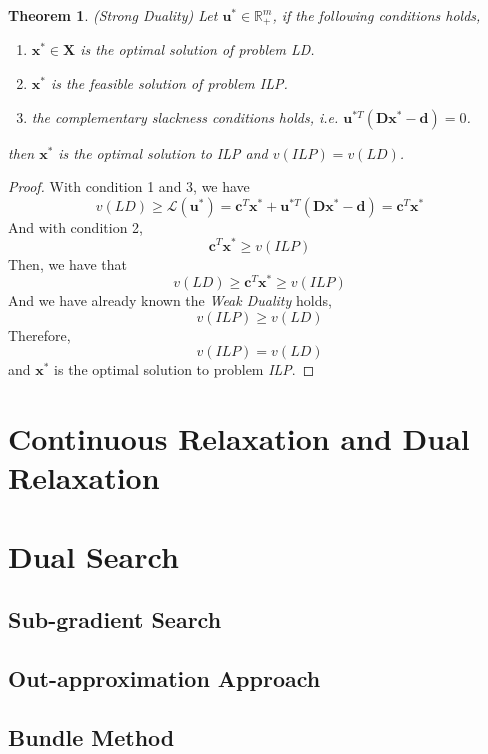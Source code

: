 \documentclass{article}
\newtheorem{thm}{Theorem}
\begin{document}
\begin{thm}
	(Strong Duality) Let $\bm{u}^* \in \mathbb{R}_+^m$, if the following conditions holds,
	\begin{enumerate}
		\item $\bm{x}^* \in \bm{X}$ is the optimal solution of problem \textit{LD}.
		\item $\bm{x}^*$ is the feasible solution of problem \textit{ILP}.
		\item the complementary slackness conditions holds, i.e. $\bm{u}^{*T}(\bm{D}\bm{x}^* - \bm{d}) = 0$.
	\end{enumerate} 
	then $\bm{x}^*$ is the optimal solution to \textit{ILP} and $v(ILP) = v(LD)$.
\end{thm}

\begin{proof}
	With condition 1 and 3, we have 
	\begin{equation}
		v(LD) \geq \mathcal{L}(\bm{u}^*) = \bm{c}^T\bm{x}^* + \bm{u}^{*T}(\bm{D}\bm{x}^*-\bm{d}) = \bm{c}^T\bm{x}^*
	\end{equation}
	And with condition 2, 
	\begin{equation}
		\bm{c}^T\bm{x}^* \geq v(ILP)
	\end{equation}
	Then, we have that
	\begin{equation}
		v(LD) \geq \bm{c}^T\bm{x}^* \geq v(ILP)
	\end{equation}
	And we have already known the \textit{Weak Duality} holds,
	\begin{equation}
		v(ILP) \geq v(LD)
	\end{equation}
	Therefore,
	\begin{equation}
		v(ILP) = v(LD)
	\end{equation}
	and $\bm{x}^*$ is the optimal solution to problem \textit{ILP}.
\end{proof}


\section{Continuous Relaxation and Dual Relaxation}
 
 
\section{Dual Search} 

\subsection{Sub-gradient Search}
 
\subsection{Out-approximation Approach}

\subsection{Bundle Method}
 
% 
% 
\end{document}
